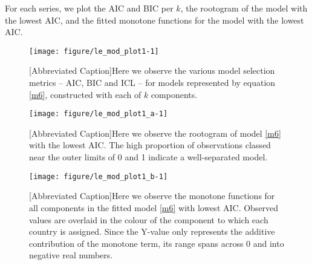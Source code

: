\documentclass[10pt]{olplainarticle}\usepackage[]{graphicx}\usepackage[]{color}
\makeatletter
\def\maxwidth{ %
  \ifdim\Gin@nat@width>\linewidth
    \linewidth
  \else
    \Gin@nat@width
  \fi
}
\newenvironment{knitrout}{}{} %
\makeatother
\begin{document}
For each series, we plot the AIC and BIC per $k$, the rootogram of the model with the lowest AIC, and the fitted monotone functions for the model with the lowest AIC.











\begin{figure}[H]
\begin{knitrout}
\color{fgcolor}

{\centering \texttt{[image: figure/le\_mod\_plot1-1]} 

}



\end{knitrout}
[Abbreviated Caption]{Here we observe the various model selection metrics -- AIC, BIC and ICL -- for models represented by equation \ref{m6}, constructed with each of $k$ components.}  
\end{figure}

\begin{figure}[H]
\begin{knitrout}
\color{fgcolor}

{\centering \texttt{[image: figure/le\_mod\_plot1\_a-1]} 

}



\end{knitrout}
[Abbreviated Caption]{Here we observe the rootogram of model \ref{m6} with the lowest AIC. The high proportion of observations classed near the outer limits of 0 and 1 indicate a well-separated model.}  
\end{figure}

\begin{figure}[H]
\begin{knitrout}
\color{fgcolor}

{\centering \texttt{[image: figure/le\_mod\_plot1\_b-1]} 

}



\end{knitrout}
[Abbreviated Caption]{Here we observe the monotone functions for all components in the fitted model \ref{m6} with lowest AIC. Observed values are overlaid in the colour of the component to which each country is assigned. Since the Y-value only represents the additive contribution of the monotone term, its range spans across 0 and into negative real numbers.}  
\end{figure}
\end{document}
